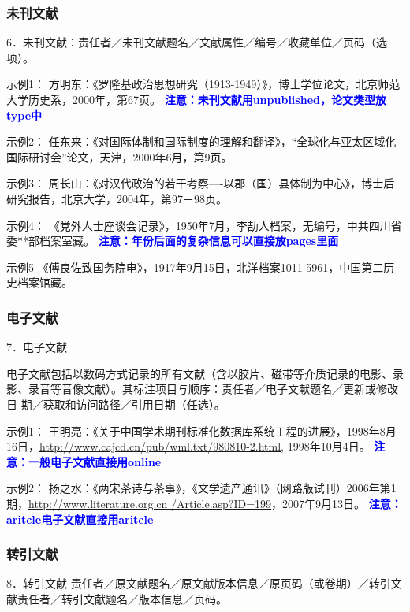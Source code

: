 \documentclass{article}
\newcommand{\qd}[1]{\textbf{\textcolor{blue}{#1}}}
\begin{document}
\subsubsection{未刊文献}
6．未刊文献：责任者／未刊文献题名／文献属性／编号／收藏单位／页码（选项）。

示例1：
方明东：《罗隆基政治思想研究（1913-1949）》，博士学位论文，北京师范大学历史系，2000年，第67页。
\qd{注意：未刊文献用unpublished，论文类型放type中}

示例2：
任东来：《对国际体制和国际制度的理解和翻译》，“全球化与亚太区域化国际研讨会”论文，天津，2000年6月，第9页。

示例3：
周长山：《对汉代政治的若干考察----以郡（国）县体制为中心》，博士后研究报告，北京大学，2004年，第97－98页。

示例4：
《党外人士座谈会记录》，1950年7月，李劼人档案，无编号，中共四川省委**部档案室藏。
\qd{注意：年份后面的复杂信息可以直接放pages里面}

示例5
《傅良佐致国务院电》，1917年9月15日，北洋档案1011-5961，中国第二历史档案馆藏。


\subsubsection{电子文献}

7．电子文献

电子文献包括以数码方式记录的所有文献（含以胶片、磁带等介质记录的电影、录影、录音等音像文献）。其标注项目与顺序：责任者／电子文献题名／更新或修改日
期／获取和访问路径／引用日期（任选）。

示例1：
王明亮：《关于中国学术期刊标准化数据库系统工程的进展》，1998年8月16日，\url{http://www.cajcd.cn/pub/wml.txt/980810-2.html}, 1998年10月4日。
\qd{注意：一般电子文献直接用online}

示例2：
扬之水：《两宋茶诗与茶事》，《文学遗产通讯》（网路版试刊）2006年第1期，\url{http://www.literature.org.cn /Article.asp?ID=199}，2007年9月13日。
\qd{注意：aritcle电子文献直接用aritcle}



\subsubsection{转引文献}
8．转引文献
责任者／原文献题名／原文献版本信息／原页码（或卷期）／转引文献责任者／转引文献题名／版本信息／页码。
\end{document}
